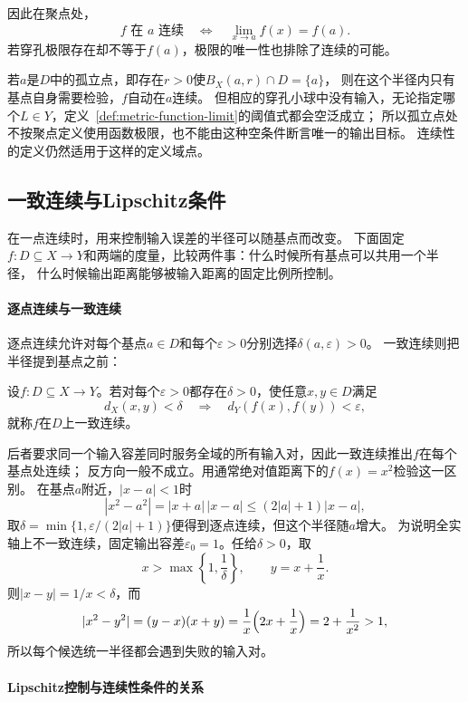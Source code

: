 因此在聚点处，
\[
  f\text{ 在 }a\text{ 连续}\quad\Longleftrightarrow\quad\lim_{x\to a}f(x)=f(a).
\]
若穿孔极限存在却不等于$f(a)$，极限的唯一性也排除了连续的可能。

若$a$是$D$中的孤立点，即存在$r>0$使$B_X(a,r)\cap D=\{a\}$，
则在这个半径内只有基点自身需要检验，$f$自动在$a$连续。
但相应的穿孔小球中没有输入，无论指定哪个$L\in Y$，定义~\ref{def:metric-function-limit}的阈值式都会空泛成立；
所以孤立点处不按聚点定义使用函数极限，也不能由这种空条件断言唯一的输出目标。
连续性的定义仍然适用于这样的定义域点。

\subsection{一致连续与Lipschitz条件}
\label{sec:metric-uniform-continuity}

在一点连续时，用来控制输入误差的半径可以随基点而改变。
下面固定$f:D\subseteq X\to Y$和两端的度量，比较两件事：什么时候所有基点可以共用一个半径，
什么时候输出距离能够被输入距离的固定比例所控制。

\paragraph{逐点连续与一致连续}

逐点连续允许对每个基点$a\in D$和每个$\varepsilon>0$分别选择$\delta(a,\varepsilon)>0$。
一致连续则把半径提到基点之前：

\begin{definition}[一致连续]
\label{def:metric-uniformly-continuous}
设$f:D\subseteq X\to Y$。若对每个$\varepsilon>0$都存在$\delta>0$，使任意$x,y\in D$满足
\[
  d_X(x,y)<\delta\quad\Longrightarrow\quad d_Y(f(x),f(y))<\varepsilon,
\]
就称$f$在$D$上一致连续。
\end{definition}

后者要求同一个输入容差同时服务全域的所有输入对，因此一致连续推出$f$在每个基点处连续；
反方向一般不成立。用通常绝对值距离下的$f(x)=x^2$检验这一区别。
在基点$a$附近，$|x-a|<1$时
\[
  |x^2-a^2|=|x+a|\,|x-a|\leq(2|a|+1)|x-a|,
\]
取$\delta=\min\{1,\varepsilon/(2|a|+1)\}$便得到逐点连续，但这个半径随$a$增大。
为说明全实轴上不一致连续，固定输出容差$\varepsilon_0=1$。任给$\delta>0$，取
\[
  x>\max\!\left\{1,\frac1\delta\right\},\qquad y=x+\frac1x.
\]
则$|x-y|=1/x<\delta$，而
\[
  |x^2-y^2|=(y-x)(x+y)=\frac1x\Bigl(2x+\frac1x\Bigr)=2+\frac1{x^2}>1,
\]
所以每个候选统一半径都会遇到失败的输入对。

\paragraph{Lipschitz控制与连续性条件的关系}

